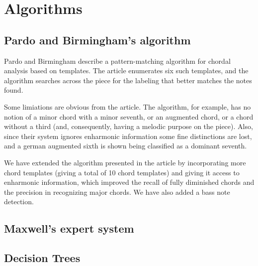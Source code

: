 \documentclass{article}
\newcommand{\comment}[1]{}
\begin{document}
\section{Algorithms}
\label{sec:algorithms}

\comment{
  ==> features usadas pelos algoritmos
  ==> técnicas variadas: busca X learning
}



\subsection{Pardo and Birmingham's algorithm}
\label{sec:pardo}

\comment{
  ==> algoritmo descrito em \cite{pardo.ea:algorithms}
  ==> baseado em templates e pattern matching
  ==> ótima recall, precisão não muito legal
  ==> ignora enarmonia
  ==> feature é um conjunto de pitches
  ==> nossa extensão:
  ===> mais templates
  ===> enarmonia
  ==> regras de desempate: a princípio promissoras, mas a abordagem
  não escala bem
}

Pardo and Birmingham \cite{pardo.ea:algorithms} describe a
pattern-matching algorithm for chordal analysis based on
templates. The article enumerates six such templates, and the
algorithm searches across the piece for the labeling that better
matches the notes found.

Some limiations are obvious from the article. The algorithm, for
example, has no notion of a minor chord with a minor seventh, or an
augmented chord, or a chord without a third (and, consequently, having
a melodic purpose on the piece). Also, since their system ignores
enharmonic information some fine distinctions are lost, and a german
augmented sixth is shown being classified as a dominant seventh.

We have extended the algorithm presented in the article by
incorporating more chord templates (giving a total of 10 chord
templates) and giving it access to enharmonic information, which
improved the recall of fully diminished chords and the precision in
recognizing major chords. We have also added a bass note detection.

\subsection{Maxwell's expert system}
\label{sec:maxwell}


\subsection{Decision Trees}
\label{sec:tree}
\end{document}
